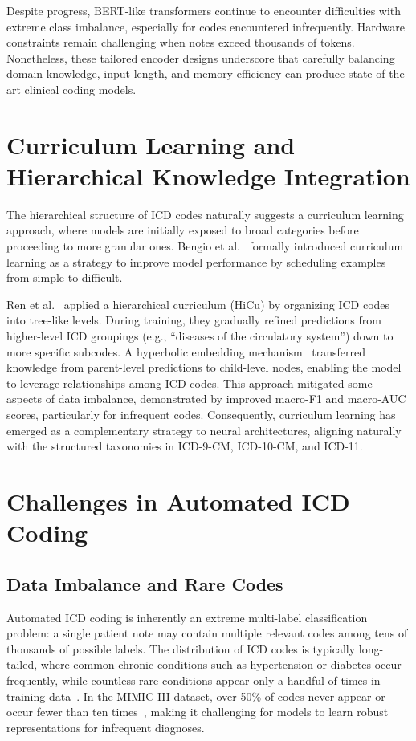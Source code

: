 Despite progress, BERT-like transformers continue to encounter difficulties with extreme class imbalance, especially for codes encountered infrequently. Hardware constraints remain challenging when notes exceed thousands of tokens. Nonetheless, these tailored encoder designs underscore that carefully balancing domain knowledge, input length, and memory efficiency can produce state-of-the-art clinical coding models.

\section{Curriculum Learning and Hierarchical Knowledge Integration}

The hierarchical structure of ICD codes naturally suggests a curriculum learning approach, where models are initially exposed to broad categories before proceeding to more granular ones. Bengio et al.~\citep{bengio2009curriculum} formally introduced curriculum learning as a strategy to improve model performance by scheduling examples from simple to difficult.

Ren et al.~\citep{ren2022hicu} applied a hierarchical curriculum (HiCu) by organizing ICD codes into tree-like levels. During training, they gradually refined predictions from higher-level ICD groupings (e.g., “diseases of the circulatory system”) down to more specific subcodes. A hyperbolic embedding mechanism~\citep{nickel2017poincare} transferred knowledge from parent-level predictions to child-level nodes, enabling the model to leverage relationships among ICD codes. This approach mitigated some aspects of data imbalance, demonstrated by improved macro-F1 and macro-AUC scores, particularly for infrequent codes. Consequently, curriculum learning has emerged as a complementary strategy to neural architectures, aligning naturally with the structured taxonomies in ICD-9-CM, ICD-10-CM, and ICD-11.

\section{Challenges in Automated ICD Coding}

\subsection{Data Imbalance and Rare Codes}

Automated ICD coding is inherently an extreme multi-label classification problem: a single patient note may contain multiple relevant codes among tens of thousands of possible labels. The distribution of ICD codes is typically long-tailed, where common chronic conditions such as hypertension or diabetes occur frequently, while countless rare conditions appear only a handful of times in training data~\citep{rios2018few}. In the MIMIC-III dataset, over 50\% of codes never appear or occur fewer than ten times~\citep{johnson2016mimic}, making it challenging for models to learn robust representations for infrequent diagnoses.

